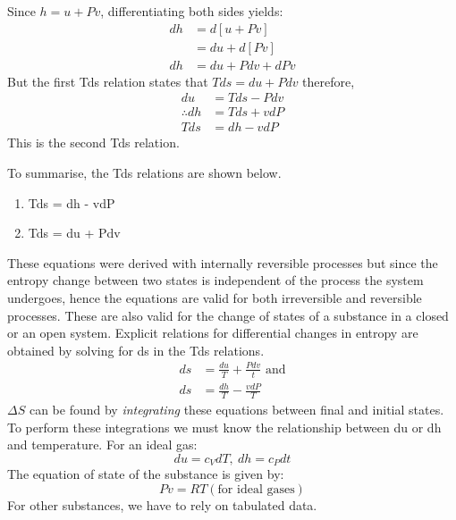 Since \( h = u + Pv \), differentiating both sides yields:
\begin{align}
  dh & = d[u+Pv]        \\
     & = du + d[Pv]     \\
  dh & = du + Pdv + dPv
\end{align}
But the first Tds relation states that \(Tds = du + Pdv\) therefore,
\begin{align}
  du            & = Tds - Pdv \\
  \therefore dh & = Tds + vdP \\
  Tds           & = dh - vdP
\end{align}
This is the second Tds relation.

To summarise, the Tds relations are shown below.
\begin{enumerate}[noitemsep]
  \item Tds = dh - vdP
  \item Tds = du + Pdv
\end{enumerate}
These equations were derived with internally reversible processes but since the entropy change between two states is independent of the process the system undergoes, hence the equations are valid for both irreversible and reversible processes. These are also valid for the change of states of a substance in a closed or an open system. Explicit relations for differential changes in entropy are obtained by solving for ds in the Tds relations.
\begin{align}
  ds & = \frac{du}{T} + \frac{Pdv}{t} \textrm{ and} \\
  ds & = \frac{dh}{T} - \frac{vdP}{T}
\end{align}
\(\Delta S\) can be found by \emph{integrating} these equations between final and initial states. To perform these integrations we must know the relationship between du or dh and temperature. For an ideal gas:
\begin{equation}
  du = c_V dT, \ dh = c_P dt
\end{equation}
The equation of state of the substance is given by:
\begin{equation}
  Pv = RT (\textrm{for ideal gases})
\end{equation}
For other substances, we have to rely on tabulated data.
